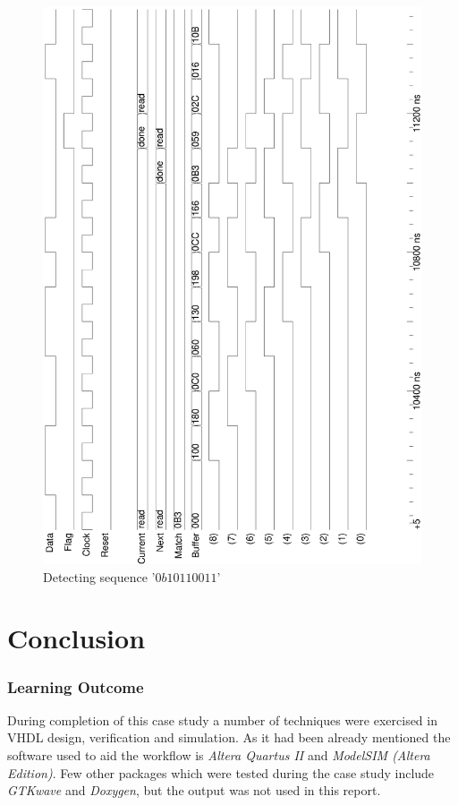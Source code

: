 \documentclass[10pt,a4paper]{report}
\begin{document}
\begin{figure}
\includegraphics[scale=0.49,angle=-90]{graphs/seq_test2.MATCHED.ps}
\caption{\small{Detecting sequence '$0b10110011$'}} \label{wave:usd:t2w2}
\end{figure}


\chapter{Conclusion}

\subsection*{Learning Outcome}
 During completion of this case study a number
 of techniques were exercised in VHDL design,
 verification and simulation. As it had been
 already mentioned the software used to aid
 the workflow is \emph{Altera Quartus II} and
 \emph{ModelSIM (Altera Edition)}. Few other
 packages which were tested during the case
 study include \emph{GTKwave} and \emph{Doxygen},
 but the output was not used in this report.
\end{document}
